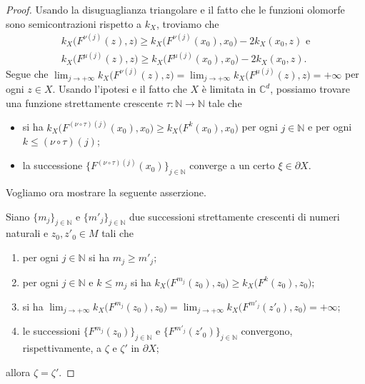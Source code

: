\begin{proof}
    Usando la disuguaglianza triangolare e il fatto che le funzioni olomorfe sono semicontrazioni rispetto a $k_X$, troviamo che
    \begin{gather*}
        k_X\big(F^{\nu(j)}(z),z\big) \ge k_X\big(F^{\nu(j)}(x_0),x_0\big)-2k_X(x_0,z)\text{ e}\\
        k_X\big(F^{\mu(j)}(z),z\big) \ge k_X\big(F^{\mu(j)}(x_0),x_0\big)-2k_X(x_0,z).
    \end{gather*}
    Segue che $\displaystyle\lim_{j\longrightarrow+\infty}k_X\big(F^{\nu(j)}(z),z\big)=\lim_{j\longrightarrow+\infty}k_X\big(F^{\mu(j)}(z),z\big)=+\infty$ per ogni $z \in X$. Usando l'ipotesi e il fatto che $X$ è limitata in $\mathbb{C}^d$, possiamo trovare una funzione strettamente crescente $\tau:\mathbb{N} \longrightarrow \mathbb{N}$ tale che
    \begin{itemize}
        \item si ha $k_X\big(F^{(\nu\circ\tau)(j)}(x_0),x_0\big) \ge k_X\big(F^k(x_0),x_0\big)$ per ogni $j \in \mathbb{N}$ e per ogni $k \le (\nu\circ\tau)(j)$;
        \item la successione $\{F^{(\nu\circ\tau)(j)}(x_0)\}_{j\in\mathbb{N}}$ converge a un certo $\xi\in\partial X$.
    \end{itemize}
    Vogliamo ora mostrare la seguente asserzione.

    Siano $\{m_j\}_{j\in\mathbb{N}}$ e $\{m'_j\}_{j\in\mathbb{N}}$ due successioni strettamente crescenti di numeri naturali e $z_0,z'_0\in M$ tali che
    \begin{enumerate}[label={(\arabic*)}]
        \item per ogni $j\in\mathbb{N}$ si ha $m_j \ge m'_j$;
        \item per ogni $j\in\mathbb{N}$ e $k \le m_j$ si ha $k_X\big(F^{m_j}(z_0),z_0\big) \ge k_X\big(F^k(z_0),z_0\big)$;
        \item si ha $\displaystyle\lim_{j\longrightarrow+\infty}k_X\big(F^{m_j}(z_0),z_0\big)=\lim_{j\longrightarrow+\infty}k_X\big(F^{m'_j}(z'_0),z_0\big)=+\infty$;
        \item le successioni $\{F^{m_j}(z_0)\}_{j\in\mathbb{N}}$ e $\{F^{m'_j}(z'_0)\}_{j\in\mathbb{N}}$ convergono, rispettivamente, a $\zeta$ e $\zeta'$ in $\partial X$;
    \end{enumerate}
    allora $\zeta=\zeta'$.


\end{proof}
